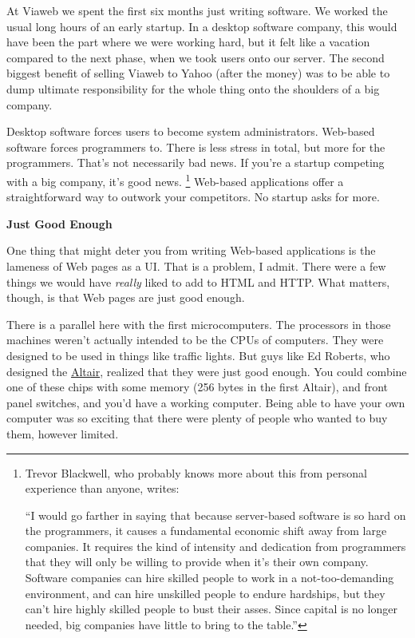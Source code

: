 At Viaweb we spent the first six months just writing software. We worked
the usual long hours of an early startup. In a desktop software company,
this would have been the part where we were working hard, but it felt
like a vacation compared to the next phase, when we took users onto our
server. The second biggest benefit of selling Viaweb to Yahoo (after the
money) was to be able to dump ultimate responsibility for the whole
thing onto the shoulders of a big company.

Desktop software forces users to become system administrators. Web-based
software forces programmers to. There is less stress in total, but more
for the programmers. That's not necessarily bad news. If you're a
startup competing with a big company, it's good news. \footnote{Trevor Blackwell, who probably knows more about this from
personal experience than anyone, writes:

``I would go farther in saying that because server-based software is so
hard on the programmers, it causes a fundamental economic shift away
from large companies. It requires the kind of intensity and dedication
from programmers that they will only be willing to provide when it's
their own company. Software companies can hire skilled people to work in
a not-too-demanding environment, and can hire unskilled people to endure
hardships, but they can't hire highly skilled people to bust their
asses. Since capital is no longer needed, big companies have little to
bring to the table.''} Web-based
applications offer a straightforward way to outwork your competitors. No
startup asks for more.

\textbf{Just Good Enough}

One thing that might deter you from writing Web-based applications is
the lameness of Web pages as a UI. That is a problem, I admit. There
were a few things we would have \emph{really} liked to add to HTML and
HTTP. What matters, though, is that Web pages are just good enough.

There is a parallel here with the first microcomputers. The processors
in those machines weren't actually intended to be the CPUs of computers.
They were designed to be used in things like traffic lights. But guys
like Ed Roberts, who designed the
\href{http://en.wikipedia.org/wiki/Altair_8800}{Altair}, realized that
they were just good enough. You could combine one of these chips with
some memory (256 bytes in the first Altair), and front panel switches,
and you'd have a working computer. Being able to have your own computer
was so exciting that there were plenty of people who wanted to buy them,
however limited.

